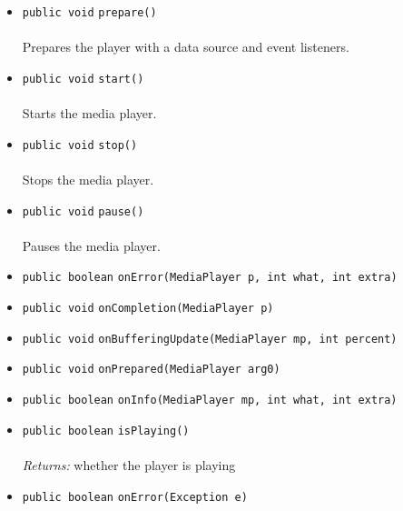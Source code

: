 \begin{itemize}
\item \lstinline|public void| \lstinline|prepare|\lstinline|()|\\ \\[-0.6em]
Prepares the player with a data source and event listeners.



\item \lstinline|public void| \lstinline|start|\lstinline|()|\\ \\[-0.6em]
Starts the media player.



\item \lstinline|public void| \lstinline|stop|\lstinline|()|\\ \\[-0.6em]
Stops the media player.



\item \lstinline|public void| \lstinline|pause|\lstinline|()|\\ \\[-0.6em]
Pauses the media player.



\item \lstinline|public boolean| \lstinline|onError|\lstinline|(MediaPlayer p, int what, int extra)| \\[-0.6em]




\item \lstinline|public void| \lstinline|onCompletion|\lstinline|(MediaPlayer p)| \\[-0.6em]




\item \lstinline|public void| \lstinline|onBufferingUpdate|\lstinline|(MediaPlayer mp, int percent)| \\[-0.6em]




\item \lstinline|public void| \lstinline|onPrepared|\lstinline|(MediaPlayer arg0)| \\[-0.6em]




\item \lstinline|public boolean| \lstinline|onInfo|\lstinline|(MediaPlayer mp, int what, int extra)| \\[-0.6em]




\item \lstinline|public boolean| \lstinline|isPlaying|\lstinline|()|\\ \\[-0.6em]
\emph{Returns:} whether the player is playing



\item \lstinline|public boolean| \lstinline|onError|\lstinline|(Exception e)| \\[-0.6em]




\end{itemize}

